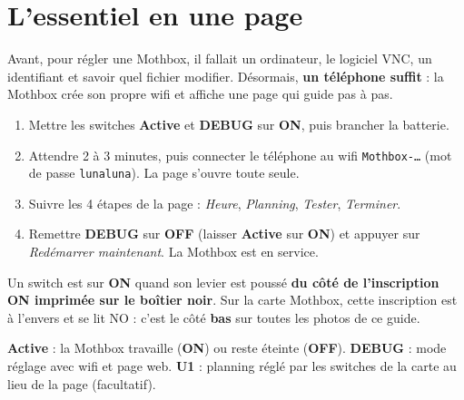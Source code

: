\documentclass[11pt,a4paper,openany]{report}
\newcommand{\sw}[1]{\textsf{\bfseries #1}}
\newcommand{\on}{\textcolor{pslvert}{\textsf{\bfseries ON}}}
\newcommand{\off}{\textcolor{pslrouge}{\textsf{\bfseries OFF}}}
\newcommand{\pasc}[2]{\tikz[baseline=(n.base)]\node[circle,fill=#1,text=white,font=\sffamily\bfseries\footnotesize,inner sep=1.5pt,minimum size=1.2em](n){#2};}
\newcommand{\pas}[1]{\pasc{pslrouge}{#1}}
\begin{document}
\chapter*{L'essentiel en une page}

\begin{synthese}[En bref]
Avant, pour régler une Mothbox, il fallait un ordinateur, le logiciel VNC, un identifiant et savoir quel fichier modifier.
Désormais, \textbf{un téléphone suffit} : la Mothbox crée son propre wifi et affiche une page qui guide pas à pas.
\end{synthese}

\begin{enumerate}[label=\protect\pas{\arabic*},leftmargin=2.2em,itemsep=6pt]
  \item Mettre les switches \sw{Active} et \sw{DEBUG} sur \on{}, puis brancher la batterie.
  \item Attendre 2 à 3 minutes, puis connecter le téléphone au wifi \texttt{Mothbox-…} (mot de passe \texttt{lunaluna}). La page s'ouvre toute seule.
  \item Suivre les 4 étapes de la page : \emph{Heure}, \emph{Planning}, \emph{Tester}, \emph{Terminer}.
  \item Remettre \sw{DEBUG} sur \off{} (laisser \sw{Active} sur \on{}) et appuyer sur \emph{Redémarrer maintenant}. La Mothbox est en service.
\end{enumerate}

\begin{attention}
Un switch est sur \on{} quand son levier est poussé \textbf{du côté de l'inscription \og ON \fg{} imprimée sur le boîtier noir}. Sur la carte Mothbox, cette inscription est à l'envers et se lit \og NO \fg{} : c'est le côté \textbf{bas} sur toutes les photos de ce guide.
\end{attention}

\begin{astuce}
\sw{Active} : la Mothbox travaille (\on) ou reste éteinte (\off). \quad
\sw{DEBUG} : mode réglage avec wifi et page web. \quad
\sw{U1} : planning réglé par les switches de la carte au lieu de la page (facultatif).
\end{astuce}

\tableofcontents

\clearpage
{}

\end{document}
